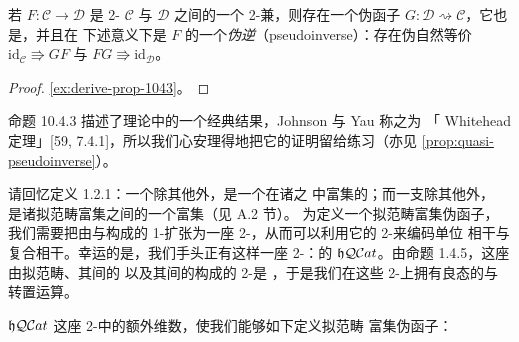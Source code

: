 \begin{proposition}\label{prop:pseudoinverse-2-functor}
若 $F\colon\mathcal{C}\to\mathcal{D}$ 是 2-\trCategory{} $\mathcal{C}$ 与
$\mathcal{D}$ 之间的一个 2-\trFunctor{}兼\trBiequivalence，则存在一个伪函子
$G\colon\mathcal{D}\rightsquigarrow\mathcal{C}$，它也是\trBiequivalence，并且在
下述意义下是 $F$ 的一个\emph{伪逆}（pseudoinverse）：存在伪自然等价
$\mathrm{id}_{\mathcal{C}}\Rrightarrow GF$ 与
$FG\Rrightarrow\mathrm{id}_{\mathcal{D}}$。
\end{proposition}

\begin{proof}
\cref{ex:derive-prop-1043}。
\end{proof}

命题 10.4.3 描述了\trBicategory{}理论中的一个经典结果，Johnson 与 Yau 称之为%
「\trBicategory{} Whitehead 定理」[59, 7.4.1]，所以我们心安理得地把它的证明留给练习（亦见%
\cref{prop:quasi-pseudoinverse}）。

请回忆定义 1.2.1：一个\trInfinityCosmos{}除其他外，是一个在诸\trQuasiCategory{}之%
\trCartesianClosed\trCategory{}中富集的\trCategory；而一支\trCosmologicalFunctor{}除其他外，
是诸拟范畴富集\trCategory{}之间的一个富集\trFunctor{}（见 A.2 节）。
为定义一个拟范畴富集伪函子，我们需要把由\trQuasiCategory{}与\trFunctor{}构成的
1-\trCategory{}扩张为一座 2-\trCategory，从而可以利用它的 2-\trCell{}来编码单位
相干与复合相干。幸运的是，我们手头正有这样一座 2-\trCategory：\trQuasiCategory{}的%
\trHomotopyTwoCategory{} $\mathfrak{h}\mathcal{Q}\mathcal{C}at$。由命题 1.4.5，这座由拟范畴、其间的%
\trFunctor{}以及其间的\trNaturalTransformation{}构成的 2-\trCategory{}是%
\trCartesianClosed{}，于是我们在这些 2-\trCell{}上拥有良态的\trCartesianProduct{}与
转置运算。

$\mathfrak{h}\mathcal{Q}\mathcal{C}at$ 这座 2-\trCategory{}中的额外维数，使我们能够如下定义拟范畴
富集伪函子：

